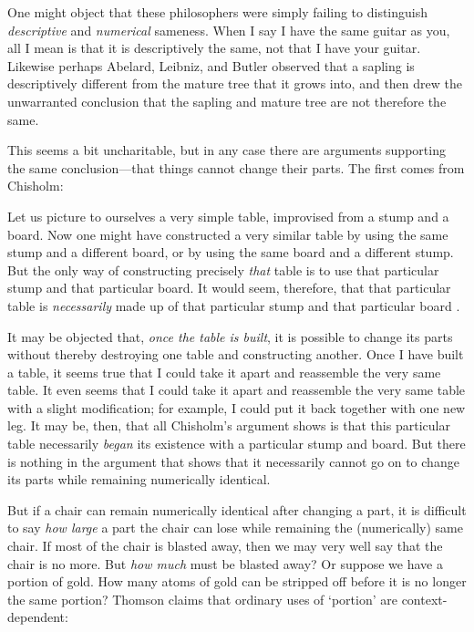 \documentclass[11pt]{article}
\newenvironment{squote}{%
\begin{spacing}{1}
\begin{list}{}{%
\setlength{\labelwidth}{0pt}%
\rightmargin\leftmargin%
}
\item\relax
}{%
\end{list}%
\end{spacing}
}
\begin{document}
\begin{spacing}{1.5}
One might object that these philosophers were simply failing to
distinguish {\em descriptive} and {\em numerical} sameness.  When I
say I have the same guitar as you, all I mean is that it is
descriptively the same, not that I have your guitar.  Likewise perhaps
Abelard, Leibniz, and Butler observed that a sapling is descriptively
different from the mature tree that it grows into, and then drew the
unwarranted conclusion that the sapling and mature tree are not
therefore the same.

This seems a bit uncharitable, but in any case there are arguments
supporting the same conclusion---that things cannot change their
parts.  The first comes from Chisholm:

\begin{squote}
Let us picture to ourselves a very simple table, improvised from a
stump and a board.  Now one might have constructed a very similar
table by using the same stump and a different board, or by using the
same board and a different stump.  But the only way of constructing
precisely {\em that} table is to use that particular stump and that
particular board.  It would seem, therefore, that that particular
table is {\em necessarily} made up of that particular stump and that
particular board \citeyearpar[146]{chisholm1979}.
\end{squote}

It may be objected that, {\em once the table is built}, it is possible
to change its parts without thereby destroying one table and
constructing another.  Once I have built a table, it seems true that I
could take it apart and reassemble the very same table.  It even seems
that I could take it apart and reassemble the very same table with a
slight modification; for example, I could put it back together with
one new leg.  It may be, then, that all Chisholm's argument shows is
that this particular table necessarily {\em began} its existence with
a particular stump and board.  But there is nothing in the argument
that shows that it necessarily cannot go on to change its parts while
remaining numerically identical.

But if a chair can remain numerically identical after changing a part,
it is difficult to say {\em how large} a part the chair can lose while
remaining the (numerically) same chair.  If most of the chair is
blasted away, then we may very well say that the chair is no more.
But {\em how much} must be blasted away?  Or suppose we have a portion
of gold.  How many atoms of gold can be stripped off before it is no
longer the same portion?  Thomson claims that ordinary uses of
`portion' are context-dependent:


\end{spacing}
\end{document}
